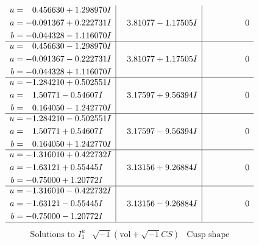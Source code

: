 \documentclass[1p]{elsarticle_modified}
\theoremstyle{definition}
\newcommand{\I}{\sqrt{-1}}
\begin{document}
$$\begin{array}{c|c|c}
\begin{aligned}
u &= \phantom{-}0.456630 + 1.298970 I \\
a &= -0.091367 + 0.222731 I \\
b &= -0.044328 - 1.116070 I\end{aligned}
 & \phantom{-}3.81077 - 1.17505 I & \phantom{-0.000000 } 0 \\ \hline\begin{aligned}
u &= \phantom{-}0.456630 - 1.298970 I \\
a &= -0.091367 - 0.222731 I \\
b &= -0.044328 + 1.116070 I\end{aligned}
 & \phantom{-}3.81077 + 1.17505 I & \phantom{-0.000000 } 0 \\ \hline\begin{aligned}
u &= -1.284210 + 0.502551 I \\
a &= \phantom{-}1.50771 - 0.54607 I \\
b &= \phantom{-}0.164050 - 1.242770 I\end{aligned}
 & \phantom{-}3.17597 + 9.56394 I & \phantom{-0.000000 } 0 \\ \hline\begin{aligned}
u &= -1.284210 - 0.502551 I \\
a &= \phantom{-}1.50771 + 0.54607 I \\
b &= \phantom{-}0.164050 + 1.242770 I\end{aligned}
 & \phantom{-}3.17597 - 9.56394 I & \phantom{-0.000000 } 0 \\ \hline\begin{aligned}
u &= -1.316010 + 0.422732 I \\
a &= -1.63121 + 0.55445 I \\
b &= -0.75000 + 1.20772 I\end{aligned}
 & \phantom{-}3.13156 + 9.26884 I & \phantom{-0.000000 } 0 \\ \hline\begin{aligned}
u &= -1.316010 - 0.422732 I \\
a &= -1.63121 - 0.55445 I \\
b &= -0.75000 - 1.20772 I\end{aligned}
 & \phantom{-}3.13156 - 9.26884 I & \phantom{-0.000000 } 0\\
 \hline 
 \end{array}$$\newpage$$\begin{array}{c|c|c}  
\text{Solutions to }I^u_{1}& \I (\text{vol} + \sqrt{-1}CS) & \text{Cusp shape}\\
 \hline 
\begin{aligned}

\end{aligned}
\end{array}$$
\end{document}
